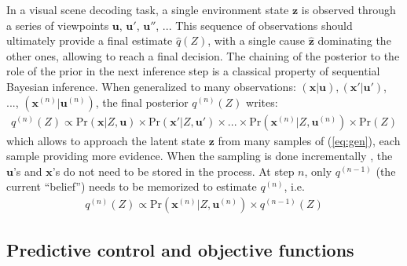 \documentclass[12pt,twoside,openright]{article}
\begin{document}
{\color{Purple} In a visual scene decoding task, a single environment state $\boldsymbol{z}$ is
observed through a series of viewpoints $\boldsymbol{u}$, $\boldsymbol{u}'$, $\boldsymbol{u}''$, ... This sequence of observations should ultimately provide a final estimate $\hat{q}(Z)$, with a single cause $\hat{\boldsymbol{z}}$ dominating the other ones, allowing to reach a final decision. }
The chaining of the posterior to the role of the prior in the next inference step is a classical property of sequential Bayesian inference.
When generalized to many observations: $(\boldsymbol{x}|\boldsymbol{u}), (\boldsymbol{x}'|\boldsymbol{u}')$, ..., $(\boldsymbol{x}^{(n)}|\boldsymbol{u}^{(n)})$, the final posterior $q^{(n)}(Z)$ writes:
\begin{align}
q^{(n)}(Z) \propto \text{Pr}(\boldsymbol{x}|Z,\boldsymbol{u}) \times \text{Pr}(\boldsymbol{x}'|Z,\boldsymbol{u}') \times ... \times \text{Pr}(\boldsymbol{x}^{(n)}|Z,\boldsymbol{u}^{(n)}) \times \text{Pr}(Z) \label{eq:accum}
\end{align}
which allows to approach the latent state $\boldsymbol{z}$ from many samples of (\ref{eq:gen}), each sample providing more evidence. 
{\color{Purple} When the sampling is done incrementally \citep{wald1945sequential},}
the $\boldsymbol{u}$'s and $\boldsymbol{x}$'s do not need to be stored in the process. At step $n$, only $q^{(n-1)}$ (the current ``belief'') needs to be memorized to estimate $q^{(n)}$, i.e. 
\begin{align} 
q^{(n)}(Z) \propto \text{Pr}(\boldsymbol{x}^{(n)}|Z,\boldsymbol{u}^{(n)}) \times q^{(n-1)}(Z) \label{eq:accum-post}
\end{align}

\subsection{Predictive control and objective functions}\label{sec:perception-driven-control}

\end{document}
